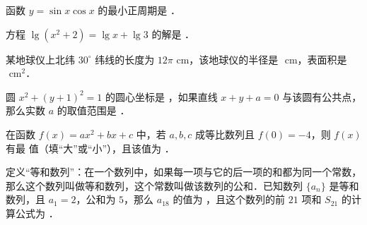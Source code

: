 \begin{question}
函数 $y=\sin x\cos x$ 的最小正周期是 \underline{\hspace{3em}}．

\end{question}
\begin{question}
方程 $\lg(x^2+2)=\lg x+\lg 3$ 的解是 \underline{\hspace{3em}}．

\end{question}
\begin{question}
某地球仪上北纬 $30^\circ$ 纬线的长度为 $12\pi\text{ cm}$，该地球仪的半径是 \underline{\hspace{3em}}$\text{ cm}$，表面积是 \underline{\hspace{3em}}$\text{ cm}^2$．

\end{question}
\begin{question}
圆 $x^2+(y+1)^2=1$ 的圆心坐标是 \underline{\hspace{3em}}，如果直线 $x+y+a=0$ 与该圆有公共点，那么实数 $a$ 的取值范围是 \underline{\hspace{3em}}．

\end{question}
\begin{question}
在函数 $f(x)=ax^2+bx+c$ 中，若 $a, b, c$ 成等比数列且 $f(0)=-4$，则 $f(x)$ 有最 \underline{\hspace{2em}} 值（填“大”或“小”），且该值为 \underline{\hspace{3em}}．

\end{question}
\begin{question}
定义“等和数列”：在一个数列中，如果每一项与它的后一项的和都为同一个常数，那么这个数列叫做等和数列，这个常数叫做该数列的公和．已知数列 $\{a_n\}$ 是等和数列，且 $a_1=2$，公和为 $5$，那么 $a_{18}$ 的值为 \underline{\hspace{3em}}，且这个数列的前 $21$ 项和 $S_{21}$ 的计算公式为 \underline{\hspace{3em}}．

\end{question}

